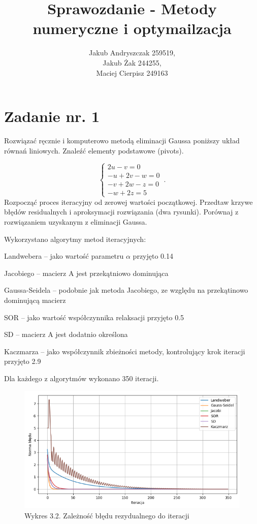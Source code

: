 \documentclass{article}
\begin{document}
\title{Sprawozdanie - Metody numeryczne i optymailzacja}
\author{Jakub Andryszczak 259519,\\ Jakub Żak 244255,\\ Maciej Cierpisz 249163}
\date{}
\maketitle

\newpage
\tableofcontents

\newpage
\section{Zadanie nr. 1}
Rozwiązać ręcznie i komputerowo metodą eliminacji Gaussa poniższy układ równań
liniowych. Znaleźć elementy podstawowe (pivots).

\begin{equation}
    \begin{cases}
      2u-v=0 \\
     -u+2v-w=0 \\
     -v+2w-z = 0 \\
     -w+2z=5
    \end{cases}\,.
\end{equation}
Rozpocząć proces iteracyjny od zerowej wartości początkowej. Przedtaw krzywe błędów residualnych i aproksymacji rozwiązania (dwa rysunki). Porównaj z rozwiązaniem uzyskanym z eliminacji Gaussa.

Wykorzystano algorytmy metod iteracyjnych:  

Landwebera – jako wartość parametru $\alpha$ przyjęto 0.14 

Jacobiego – macierz A jest przekątniowo dominująca 

Gaussa-Seidela – podobnie jak metoda Jacobiego, ze względu na przekątinowo dominującą macierz 

SOR – jako wartość współczynnika relaksacji przyjęto 0.5 

SD – macierz A jest dodatnio określona 

Kaczmarza – jako współczynnik zbieżności metody, kontrolujący krok iteracji przyjęto 2.9 

Dla każdego z algorytmów wykonano 350 iteracji.  

\begin{figure}[H]
  \includegraphics[width=1.5\textwidth, center]{Zad1.1.png}
  \centering
  \captionsetup[Tabela]{name=New Table Name}
  \caption*{Wykres 3.2. Zależność błędu rezydualnego do iteracji}
\end{figure}
\end{document}
